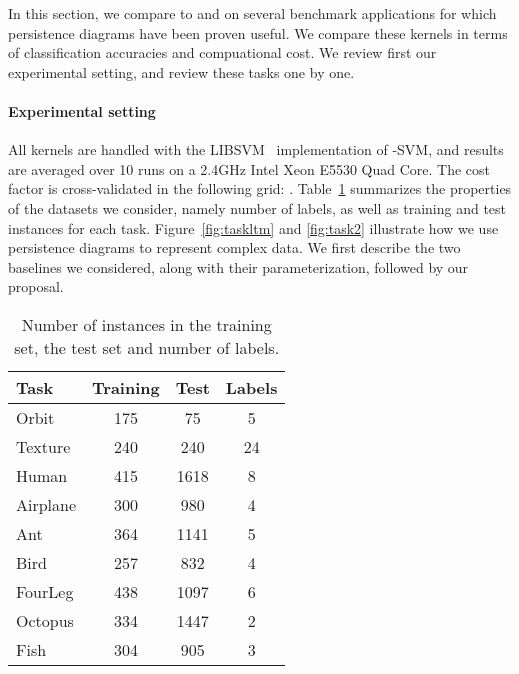 \documentclass[11pt]{article}
\begin{document}
In this section, we compare  to  and  on 
several benchmark applications for which persistence diagrams have been proven useful. We compare these kernels in terms of classification 
accuracies and compuational cost. We review first our experimental setting, and review these tasks one by one.

\paragraph*{Experimental setting}
 All kernels are handled with the LIBSVM~\cite{Chang01} implementation of -SVM, and results are averaged over 10 runs
on a 2.4GHz Intel Xeon E5530 Quad Core.
The cost factor  is cross-validated in the following grid: .
Table~\ref{table:sum} summarizes the properties of the datasets we consider, namely number of labels, as well as training and test instances 
for each task. Figure~\ref{fig:taskltm} and \ref{fig:task2} illustrate how we use persistence diagrams to represent complex data.
We first describe the two baselines we considered, along with their parameterization, followed by our proposal.

\begin{table}[t]
\vskip 0.15in
\begin{center}
\begin{small}
\begin{sc}
\begin{tabular}{|l|c|c|c|}
\hline
 Task &        Training &                               Test &                       Labels \\
\hline
Orbit &        175 &                                    75 &                         5  \\
Texture &      240 &                                    240 &                        24  \\
Human &        415 &                                    1618 &                       8 \\
Airplane &     300 &                                    980 &                        4 \\
Ant &          364 &                                    1141 &                       5 \\
Bird &         257 &                                    832 &                        4 \\
FourLeg &      438 &                                    1097 &                       6 \\
Octopus &      334 &                                    1447 &                       2 \\
Fish &         304 &                                    905 &                        3 \\
\hline          
\end{tabular}
\end{sc}
\end{small}
\caption{\label{table:sum} Number of instances in the training set, the test set and number of labels.}
\end{center}
\vskip -0.1in
\end{table}
\end{document}
